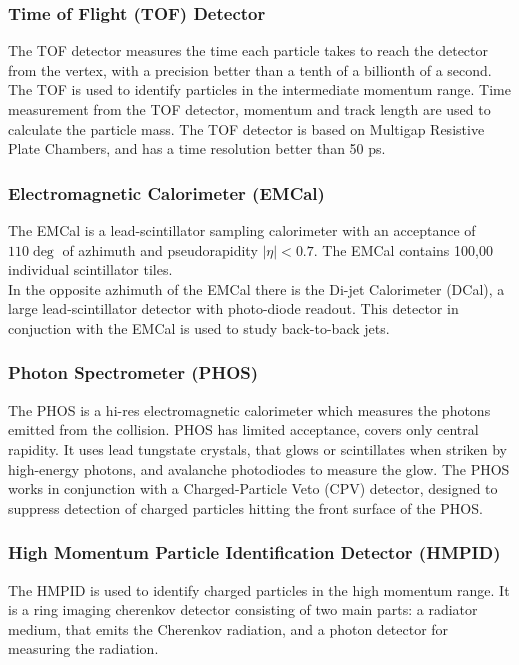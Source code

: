 \documentclass[12pt,a4paper,twoside]{report}
\begin{document}
\subsubsection{Time of Flight (TOF) Detector}
The TOF detector measures the time each particle takes to reach the detector from the vertex, with a precision better than a tenth of a billionth of a second. The TOF is used to identify particles in the intermediate momentum range. Time measurement from the TOF detector, momentum and track length are used to calculate the particle mass. The TOF detector is based on Multigap Resistive Plate Chambers, and has a time resolution better than 50 ps. \cite{Ref:ALICE-detectors-TOF}
\subsubsection{Electromagnetic Calorimeter (EMCal)}
The EMCal is a lead-scintillator sampling calorimeter with an acceptance of $110\deg$ of azhimuth and pseudorapidity $|\eta|<0.7$. The EMCal contains 100,00 individual scintillator tiles.\\
In the opposite azhimuth of the EMCal there is the Di-jet Calorimeter (DCal), a large lead-scintillator detector with photo-diode readout. This detector in conjuction with the EMCal is used to study back-to-back jets. \cite{Ref:ALICE-detectors-EMCal}
\subsubsection{Photon Spectrometer (PHOS)}
The PHOS is a hi-res electromagnetic calorimeter which measures the photons emitted from the collision. PHOS has limited acceptance, covers only central rapidity. It uses lead tungstate crystals, that glows or scintillates when striken by high-energy photons, and avalanche photodiodes to measure the glow. The PHOS works in conjunction with a Charged-Particle Veto (CPV) detector, designed to suppress detection of charged particles hitting the front surface of the PHOS. \cite{Ref:ALICE-detectors-PHOS}
\subsubsection{High Momentum Particle Identification Detector (HMPID)}
The HMPID is used to identify charged particles in the high momentum range. It is a ring imaging cherenkov detector consisting of two main parts: a radiator medium, that emits the Cherenkov radiation, and a photon detector for measuring the radiation. \cite{Ref:ALICE-detectors-HMPID}
\end{document}
